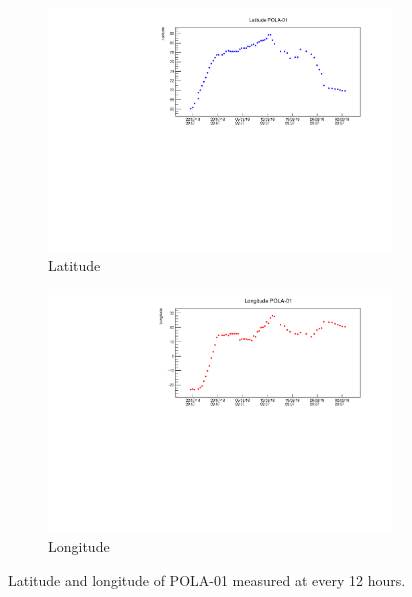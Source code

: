 \documentclass[12pt,a4paper]{amsart}
\begin{document}
\begin{figure}
\centering
	\begin{subfigure}[b]{0.6\textwidth}
	\centering
		\includegraphics[width=\textwidth]{../data/plots/POLA-01/Latitude_POLA-01.pdf}
		\caption{Latitude}
		\label{fig:latitude_POLA-01}
	\end{subfigure}%
	\begin{subfigure}[b]{0.6\textwidth}
	\centering
		\includegraphics[width=\textwidth]{../data/plots/POLA-01/Longitude_POLA-01.pdf}
		\caption{Longitude}
		\label{fig:longitude_POLA-01}
	\end{subfigure}
	\caption{Latitude and longitude of POLA-01 measured at every 12 hours.}
	\label{fig:longitude_and_latitude}
\end{figure}
\end{document}
